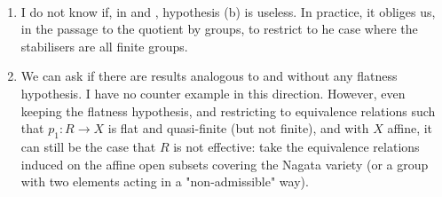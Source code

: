 \begin{remark}\label{fga3.iii-6-remarks-6.3}
    ~
    \begin{enumerate}
        \item I do not know if, in  and , hypothesis (b) is useless.
              In practice, it obliges us, in the passage to the quotient by groups, to restrict to he case where the stabilisers are all finite groups.
        \item We can ask if there are results analogous to  and  without any flatness hypothesis.
              I have no counter example in this direction.
              However, even keeping the flatness hypothesis, and restricting to equivalence relations such that $p_1\colon R\to X$ is flat and quasi-finite (but not finite), and with $X$ affine, it can still be the case that $R$ is not effective: take the equivalence relations induced on the affine open subsets covering the Nagata variety (or a group with two elements acting in a "non-admissible" way).
    \end{enumerate}
\end{remark}